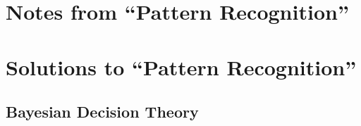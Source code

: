 \documentclass[12pt, a4paper]{article}
\title{\Title}
\author{\Author}
\begin{document}
	
\maketitle
\begin{abstract}
This document contains some notes and solutions to the book ``Pattern Classification'' by Duda et al.
\end{abstract}

\tableofcontents

\section{Notes from ``Pattern Recognition''}

\section{Solutions to ``Pattern Recognition''}

\subsection{Bayesian Decision Theory}
\end{document}
